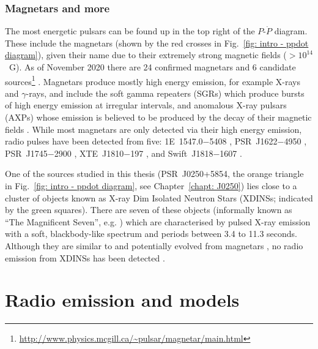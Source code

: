 \subsubsection*{Magnetars and more}
\label{sec: intro - general intro - pulsar population - magnetars etc}

The most energetic pulsars can be found up in the top right of the $P$-$\dot{P}$ diagram. These include the magnetars (shown by the red crosses in Fig.~\ref{fig: intro - ppdot diagram}), given their name due to their extremely strong magnetic fields ($>10^{14}$~G). As of November 2020 there are 24 confirmed magnetars and 6 candidate sources\footnote{\url{http://www.physics.mcgill.ca/~pulsar/magnetar/main.html}} \citep{OKxx2014}. Magnetars produce mostly high energy emission, for example X-rays and $\gamma$-rays, and include the soft gamma repeaters (SGRs) which produce bursts of high energy emission at irregular intervals, and anomalous X-ray pulsars (AXPs) whose emission is believed to be produced by the decay of their magnetic fields \citep{TDxx1995, TDxx1996, Mxxx2008}. While most magnetars are only detected via their high energy emission, radio pulses have been detected from five: 1E~1547.0$-$5408 \citep{CRHR2007a}, PSR~J1622$-$4950 \citep{LBB+2010}, PSR~J1745$-$2900 \citep{EFK+2013}, XTE~J1810$-$197 \citep{CRH+2006}, and Swift~J1818$-$1607 \citep{ERB+2020, LSJB2020}.

One of the sources studied in this thesis (PSR~J0250+5854, the orange triangle in Fig.~\ref{fig: intro - ppdot diagram}, see Chapter~\ref{chapt: J0250}) lies close to a cluster of objects known as X-ray Dim Isolated Neutron Stars (XDINSs; indicated by the green squares). There are seven of these objects (informally known as ``The Magnificent Seven'', e.g. \citealt{Hxxx2007}) which are characterised by pulsed X-ray emission with a soft, blackbody-like spectrum and periods between 3.4 to 11.3 seconds. Although they are similar to and potentially evolved from magnetars \citep{VRP+2013}, no radio emission from XDINSs has been detected \citep{Jxxx2003, KKM+2003, KML+2009}.









\section{Radio emission and models}
\label{sec: intro - emission models}

